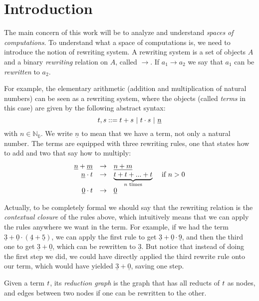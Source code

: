 \chapter{Introduction}

The main concern of this work will be to analyze and understand \emph{spaces of computations}.
To understand what a space of computations is, we need to introduce the notion of rewriting system.
A rewriting system is a set of objects $A$ and a binary \emph{rewriting} relation
on $A$, called $\to$.
If $a_1 \to a_2$ we say that $a_1$ can be \emph{rewritten} to $a_2$.

For example, the elementary arithmetic (addition and multiplication of natural numbers)
can be seen as a rewriting system, where the objects (called \emph{terms} in this case) are
given by the following abstract syntax:
\[
  \tm, \tmtwo ::= \tm + \tmtwo \ |\ \tm \cdot \tmtwo \ |\ \underline{n}
\]
\noindent with $n \in \mathbb{N_0}$. We write $\underline{n}$ to mean that we have a term,
not only a natural number.
The terms are equipped with three rewriting rules,
one that states how to add and two that say how to multiply:
\[
\begin{array}{rclc}
  \underline{n} + \underline{m} & \to & \underline{n + m} & \\
  \underline{n} \cdot t       & \to & \underbrace{t + t + ... + t}_{n \text{ times}} & \text{ if } n > 0 \\
  \underline{0} \cdot t       & \to & \underline{0} &
\end{array}
\]

Actually, to be completely formal we should say that the rewriting relation is the \emph{contextual closure}
of the rules above, which intuitively means that we can apply the rules anywhere we want in the term.
For example, if we had the term $\underline{3} + \underline{0} \cdot (\underline{4} + \underline{5})$,
we can apply the first rule to get $\underline{3} + \underline{0} \cdot \underline{9}$,
and then the third one to get $\underline{3} + \underline{0}$, which can be rewritten to $\underline{3}$.
But notice that instead of doing the first step we did, we could have directly applied the third rewrite rule
onto our term, which would have yielded $\underline{3} + \underline{0}$, saving one step.

Given a term $t$, its \emph{reduction graph} is the graph that has all
reducts of $t$ as nodes,
and edges between two nodes if one can be rewritten to the other.

